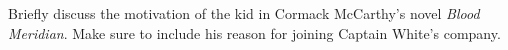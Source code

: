 \needspace{2cm}
\question[5] Briefly discuss the motivation of the kid in Cormack McCarthy's novel \textit{Blood Meridian}.
Make sure to include his reason for joining Captain White's company.
\vspace{6cm}
